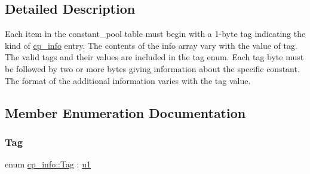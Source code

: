 \subsection{Detailed Description}
Each item in the constant\+\_\+pool table must begin with a 1-\/byte tag indicating the kind of \hyperlink{structcp__info}{cp\+\_\+info} entry. The contents of the info array vary with the value of tag. The valid tags and their values are included in the tag enum. Each tag byte must be followed by two or more bytes giving information about the specific constant. The format of the additional information varies with the tag value. 

\subsection{Member Enumeration Documentation}
\mbox{\label{structcp__info_acdef8472ed83e12e3a87bca8d6001f69}} 
\subsubsection{\texorpdfstring{Tag}{Tag}}
{\footnotesize\ttfamily enum \hyperlink{structcp__info_acdef8472ed83e12e3a87bca8d6001f69}{cp\+\_\+info\+::\+Tag} \+: \hyperlink{types_8h_a162f47a77ee24f6f77cd8c82ccd40ab7}{u1}\hspace{0.3cm}{\ttfamily [strong]}}

